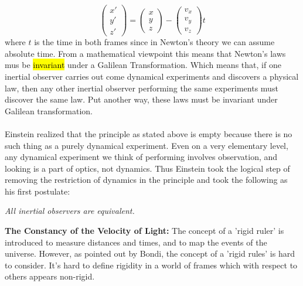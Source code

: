 \documentclass[10pt,a4paper,twocolumn]{article}
\newcounter{theo}
\newcounter{def}
\newcommand{\hldb}[1]{%
    \sethlcolor{lightdelectricblue}%
    \hl{#1}%
}
\begin{document}
                \begin{equation}
                        \begin{pmatrix}
                            x' \\ y' \\ z' 
                        \end{pmatrix}
                        =
                        \begin{pmatrix}
                            x \\ y \\ z
                        \end{pmatrix}
                        -
                        \begin{pmatrix}
                            v_x \\ v_y \\ v_z
                        \end{pmatrix}t
                \end{equation}
                \indent where $t$ is the time in both frames since in Newton's theory we can assume absolute time. From a mathematical viewpoint this means that Newton's laws mus be \hldb{invariant} under a Galilean Transformation. Which means that, if one inertial observer carries out come dynamical experiments and discovers a physical law, then any other inertial observer performing the same experiments must discover the same law. Put another way, these laws must be invariant under Galilean transformation. 
                \\
                \\
                \indent Einstein realized that the principle as stated above is empty because there is no such thing as a purely dynamical experiment. Even on a very elementary level, any dynamical experiment we think of performing involves observation, and looking is a part of optics, not dynamics. Thus Einstein took the logical step of removing the restriction of dynamics in the principle and took the following as his first postulate:
                \begin{definition}\textit{
                    All inertial observers are equivalent.}
                \end{definition}
                \indent \textbf{The Constancy of the Velocity of Light:} The concept of a 'rigid ruler' is introduced to measure distances and times, and to map the events of the universe. However, as pointed out by Bondi, the concept of a 'rigid rules' is hard to consider. It's hard to define rigidity in a world of frames which with respect to others appears non-rigid. 
\end{document}
